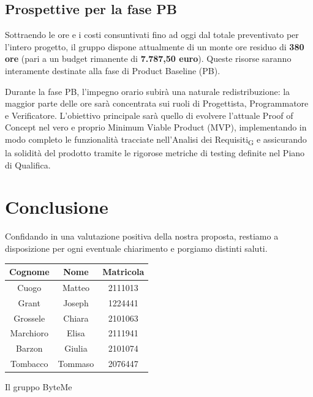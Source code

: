 \documentclass[11pt,a4paper]{article}
\newcommand{\gls}[1]{#1\textsubscript{G}}
\begin{document}
\subsection*{Prospettive per la fase PB}
Sottraendo le ore e i costi consuntivati fino ad oggi dal totale preventivato per l'intero progetto, il gruppo dispone attualmente di un monte ore residuo di \textbf{380 ore} (pari a un budget rimanente di \textbf{7.787,50 euro}). Queste risorse saranno interamente destinate alla fase di Product Baseline (PB).

Durante la fase PB, l'impegno orario subirà una naturale redistribuzione: la maggior parte delle ore sarà concentrata sui ruoli di Progettista, Programmatore e Verificatore. L'obiettivo principale sarà quello di evolvere l'attuale Proof of Concept nel vero e proprio Minimum Viable Product (MVP), implementando in modo completo le funzionalità tracciate nell'\gls{Analisi dei Requisiti} e assicurando la solidità del prodotto tramite le rigorose metriche di testing definite nel Piano di Qualifica.


\newpage
\section{Conclusione}
Confidando in una valutazione positiva della nostra proposta, restiamo a disposizione per ogni eventuale chiarimento e porgiamo distinti saluti.

\begin{table}[H]
    \centering
    \begin{tabular}{|c|c|c|}
        \hline
        \textbf{Cognome} & \textbf{Nome} & \textbf{Matricola} \\
        \hline
        Cuogo & Matteo & 2111013 \\
        \hline
        Grant & Joseph & 1224441 \\
        \hline
        Grossele & Chiara & 2101063 \\
        \hline
        Marchioro & Elisa & 2111941 \\
        \hline
        Barzon & Giulia & 2101074 \\
        \hline
        Tombacco & Tommaso & 2076447 \\
        \hline
    \end{tabular}
\end{table}

\hfill Il gruppo ByteMe
\end{document}
